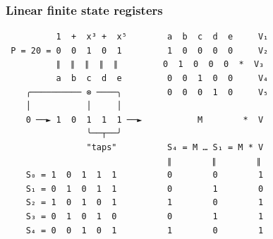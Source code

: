\documentclass{beamer}
\begin{document}
    \begin{frame}[fragile]
        \frametitle{Linear finite state registers}
        \begin{verbatim}
          1  +  x³ +  x⁵        a  b  c  d  e     V₁
 P = 20 = 0  0  1  0  1         1  0  0  0  0     V₂
          ∥  ∥  ∥  ∥  ∥         0  1  0  0  0  *  V₃
          a  b  c  d  e         0  0  1  0  0     V₄
    ╭────────── ⊗ ────╮         0  0  0  1  0     V₅
    │           │     │
    0 ──► 1  0  1  1  1 ──►           M        *  V
                ╰──┬──╯
                "taps"          S₄ = M … S₁ = M * V
                                ∥        ∥        ∥
    S₀ = 1  0  1  1  1          0        0        1
    S₁ = 0  1  0  1  1          0        1        0
    S₂ = 1  0  1  0  1          1        0        1
    S₃ = 0  1  0  1  0          0        1        1
    S₄ = 0  0  1  0  1          1        0        1
        \end{verbatim}
    \end{frame}
\end{document}
